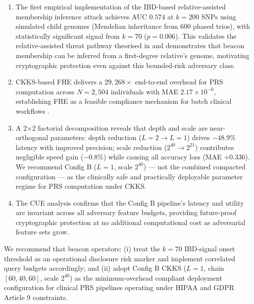 \documentclass[conference]{IEEEtran}
\begin{document}
\begin{enumerate}
    \item The first empirical implementation of the IBD-based relative-assisted
    membership inference attack achieves AUC $0.574$ at $k=200$ SNPs using
    simulated child genomes (Mendelian inheritance from 600 phased trios), with
    statistically significant signal from $k=70$ ($p=0.006$). This validates
    the relative-assisted threat pathway theorised in \cite{gymrek2013,
    erlich2014} and demonstrates that beacon membership can be inferred from a
    first-degree relative's genome, motivating cryptographic protection even
    against this bounded-risk adversary class.

    \item CKKS-based FHE delivers a $29{,}268\times$ end-to-end overhead for
    PRS computation across $N=2{,}504$ individuals with MAE $2.17\times10^{-6}$,
    establishing FHE as a feasible compliance mechanism for batch clinical
    workflows \cite{blatt2020,cheon2017}.

    \item A 2$\times$2 factorial decomposition reveals that depth and scale
    are near-orthogonal parameters: depth reduction ($L=2\to L=1$) drives
    $-48.9\%$ latency with improved precision; scale reduction ($2^{40}\to
    2^{21}$) contributes negligible speed gain ($-0.8\%$) while causing all
    accuracy loss (MAE $+0.336$). We recommend Config B ($L=1$, scale $2^{40}$)
    --- not the combined compacted configuration --- as the clinically safe and
    practically deployable parameter regime for PRS computation under CKKS.

    \item The CUE analysis confirms that the Config B pipeline's latency and
    utility are invariant across all adversary feature budgets, providing
    future-proof cryptographic protection at no additional computational cost
    as adversarial feature sets grow.
\end{enumerate}

We recommend that beacon operators: (i) treat the $k=70$ IBD-signal onset
threshold as an operational disclosure risk marker and implement correlated
query budgets accordingly; and (ii) adopt Config B CKKS ($L=1$, chain
$[60,40,60]$, scale $2^{40}$) as the minimum-overhead compliant deployment
configuration for clinical PRS pipelines operating under HIPAA and GDPR
Article 9 constraints.

\end{document}
